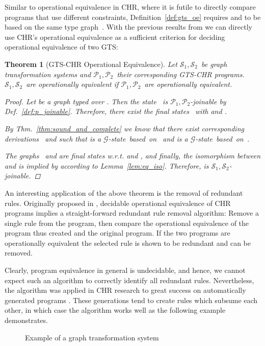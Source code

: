 \documentclass{tlp}
\newtheorem{theorem}{Theorem}\newtheorem{corollary}[theorem]{Corollary}
\newcommand{\mcG}{\ensuremath{\mathcal{G}}}
\newcommand{\mcP}{\ensuremath{\mathcal{P}}}
\newcommand{\mcS}{\ensuremath{\mathcal{S}}}
\newcommand{\Ps}{\ensuremath{\mcP_1,\mcP_2}}
\newcommand{\Ss}{\ensuremath{\mcS_1,\mcS_2}}
\begin{document}
Similar to operational equivalence in CHR, where it is futile to directly compare
programs that use different constraints, Definition~\ref{def:gts_oe} requires
 and  to be based on the same type graph~. With the previous
results from \cite{Raiser2009} we can directly use CHR's operational equivalence
as a sufficient criterion for deciding operational equivalence of two GTS:

\begin{theorem}[GTS-CHR Operational Equivalence]\label{thm:gtsopeq}
Let \Ss\ be graph transformation systems and \Ps\ their corresponding GTS-CHR
programs. \Ss\ are operationally equivalent if \Ps\ are operationally
equivalent.

\begin{proof}

Let  be a graph typed over . Then the state~ is \Ps-joinable by Def.~\ref{def:p_joinable}. Therefore,
there exist the final states~ with  and .

By Thm.~\ref{thm:sound_and_complete} we know that there exist corresponding
derivations~ and  such
that  is a \mcG-state~based~on~ and  is a
\mcG-state~based~on~.

The graphs~ and  are final states w.r.t.  and , and
finally, the isomorphism between  and  is implied by  according to Lemma~\ref{lem:eq_iso}. Therefore,  is \Ss-joinable.
\end{proof}
\end{theorem}

An interesting application of the above theorem is the removal of redundant
rules. Originally proposed in \cite{Abdennadher2003}, decidable operational
equivalence of CHR programs implies a straight-forward redundant rule removal
algorithm: Remove a single rule from the program, then compare the operational
equivalence of the program thus created and the original program. If the two
programs are operationally equivalent the selected rule is shown to be redundant
and can be removed.

Clearly, program equivalence in general is undecidable, and hence, we cannot
expect such an algorithm to correctly identify all redundant rules. Nevertheless,
the algorithm was applied in CHR research to great success on automatically
generated programs \cite{Abdennadher2007,raiser08cp}. These generations tend to
create rules which subsume each other, in which case the algorithm works well as
the following example demonstrates.

\begin{figure}
\centerline{
}
\caption{Example of a graph transformation system}
\label{fig:ex:opeq}
\end{figure}
\end{document}
